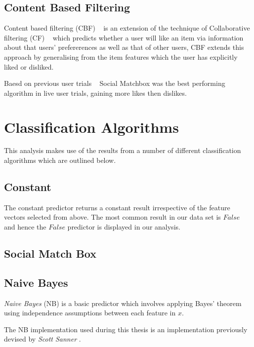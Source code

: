 \subsection{Content Based Filtering}
\label{sec:cbf}

Content based filtering (CBF) ~\cite{newsweeder} is an extension of the technique of Collaborative filtering (CF) ~\cite{collab_filtering} 
which predicts whether a user will like an item via information about that users' prefererences as well as that of other users, CBF extends 
this approach by generalising from the item features which the user has explicitly liked or disliked.

Baesd on previous user trials ~\cite{joseph} Social Matchbox was the best performing algorithm in live user trials, gaining more likes then
dislikes.

\section{Classification Algorithms}
\label{sec:meth}

This analysis makes use of the results from a number of different classification algorithms which are outlined below.

\subsection{Constant}
\label{sec:const}

The constant predictor returns a constant result irrespective of the feature vectors selected from above. The most common result in our data
set is $False$ and hence the $False$ predictor is displayed in our analysis.

\subsection{Social Match Box}
\label{sec:sr}

\subsection{Naive Bayes}
\label{sec:nb}

\emph{Naive Bayes} (NB) is a basic predictor which involves applying Bayes' theorem using independence assumptions between each feature in $x$.

The NB implementation used during this thesis is an implementation previously devised by \emph{Scott Sanner} \cite{scott}.

